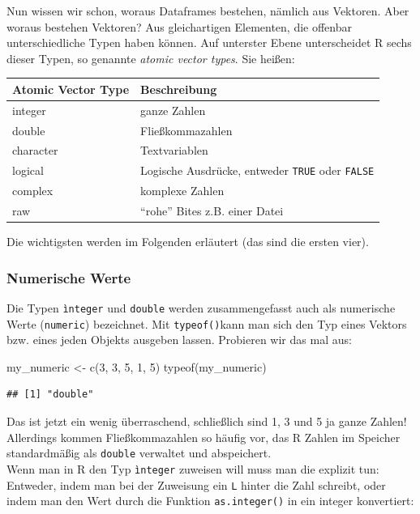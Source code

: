 \documentclass[
]{book}
\newenvironment{Shaded}{\begin{snugshade}}{\end{snugshade}}
\newcommand{\DecValTok}[1]{\textcolor[rgb]{0.00,0.00,0.81}{#1}}
\newcommand{\FunctionTok}[1]{\textcolor[rgb]{0.00,0.00,0.00}{#1}}
\newcommand{\NormalTok}[1]{#1}
\newcommand{\OtherTok}[1]{\textcolor[rgb]{0.56,0.35,0.01}{#1}}
\begin{document}
Nun wissen wir schon, woraus Dataframes bestehen, nämlich aus Vektoren. Aber woraus bestehen Vektoren? Aus gleichartigen Elementen, die offenbar unterschiedliche Typen haben können. Auf unterster Ebene unterscheidet R sechs dieser Typen, so genannte \emph{atomic vector types}. Sie heißen:

\begin{longtable}[]{@{}ll@{}}
\toprule
Atomic Vector Type & Beschreibung\tabularnewline
\midrule
\endhead
integer & ganze Zahlen\tabularnewline
double & Fließkommazahlen\tabularnewline
character & Textvariablen\tabularnewline
logical & Logische Ausdrücke, entweder \texttt{TRUE} oder \texttt{FALSE}\tabularnewline
complex & komplexe Zahlen\tabularnewline
raw & ``rohe'' Bites z.B. einer Datei\tabularnewline
\bottomrule
\end{longtable}

Die wichtigsten werden im Folgenden erläutert (das sind die ersten vier).

\hypertarget{numerische-werte}{%
\subsubsection{Numerische Werte}\label{numerische-werte}}

Die Typen \texttt{ìnteger} und \texttt{double} werden zusammengefasst auch als numerische Werte (\texttt{numeric}) bezeichnet. Mit \texttt{typeof()}kann man sich den Typ eines Vektors bzw. eines jeden Objekts ausgeben lassen. Probieren wir das mal aus:

\begin{Shaded}
\begin{Highlighting}[]
\NormalTok{my\_numeric }\OtherTok{\textless{}{-}} \FunctionTok{c}\NormalTok{(}\DecValTok{3}\NormalTok{, }\DecValTok{3}\NormalTok{, }\DecValTok{5}\NormalTok{, }\DecValTok{1}\NormalTok{, }\DecValTok{5}\NormalTok{)}
\FunctionTok{typeof}\NormalTok{(my\_numeric)}
\end{Highlighting}
\end{Shaded}

\begin{verbatim}
## [1] "double"
\end{verbatim}

Das ist jetzt ein wenig überraschend, schließlich sind 1, 3 und 5 ja ganze Zahlen! Allerdings kommen Fließkommazahlen so häufig vor, das R Zahlen im Speicher standardmäßig als \texttt{double} verwaltet und abspeichert.\\
Wenn man in R den Typ \texttt{ìnteger} zuweisen will muss man die explizit tun: Entweder, indem man bei der Zuweisung ein \texttt{L} hinter die Zahl schreibt, oder indem man den Wert durch die Funktion \texttt{as.integer()} in ein integer konvertiert:
\end{document}
